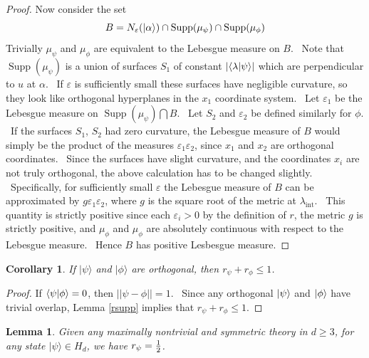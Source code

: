 \documentclass[letterpaper,11pt]{article}
\newtheorem{lem}{Lemma}
\newtheorem{cor}{Corollary}
\newcommand{\braket}[2]{\mbox{$ \langle #1 | #2 \rangle $}}
\newcommand{\ket}[1]{\mbox{$ | #1 \rangle $}}
\DeclareMathOperator{\supp}{Supp}
\begin{document}
\begin{proof}
Now consider the set
\[
B= N_{\varepsilon}(\ket{\alpha}) \cap  \supp(\mu_{\psi}) \cap \supp(\mu_{\phi})
\]
Trivially $\mu_{\psi}$ and $\mu_\phi$ are equivalent to the Lebesgue measure on $B$. \ Note that $\supp(\mu_{\psi})$ is a union of surfaces $S_1$ of constant $| \braket{\lambda }{\psi}|$ which are perpendicular to $u$ at $\alpha$. \ If $\varepsilon$ is sufficiently small these surfaces have negligible curvature, so they look like orthogonal hyperplanes in the $x_1$ coordinate system.  \ Let $\varepsilon_1$ be the Lebesgue measure on $\supp(\mu_{\psi}) \bigcap B$. \ Let $S_2$ and $\varepsilon_2$ be defined similarly for $\phi$. \ If the surfaces $S_1$, $S_2$ had zero curvature, the Lebesgue measure of $B$ would simply be the product of the measures $\varepsilon_1 \varepsilon_2$, since $x_1$ and $x_2$ are orthogonal coordinates. \ Since the surfaces have slight curvature, and the coordinates $x_i$ are not truly orthogonal, the above calculation has to be changed slightly. \ Specifically, for sufficiently small $\varepsilon$ the Lebesgue measure of $B$ can be approximated by $g\varepsilon_1 \varepsilon_2$, where $g$ is the square root of the metric at $\lambda_{\mathrm{int}}$. \ This quantity is strictly positive since each $\varepsilon_i>0$ by the definition of $r$, the metric $g$ is strictly positive, and $\mu_{\phi}$ and $\mu_\phi$ are absolutely continuous with respect to the Lebesgue measure. \ Hence $B$ has positive Lesbesgue measure.

\end{proof}

\begin{cor}
\label{rorth} If $ | \psi \rangle $ and $ | \phi \rangle $
are orthogonal, then $r_{\psi}+r_{\phi}\leq 1$.
\end{cor}

\begin{proof}
If $\braket{\psi}{\phi}=0$, then $||\psi-\phi||=1$. \ Since any orthogonal $\ket{\psi}$ and $\ket{\phi}$ have trivial overlap, Lemma \ref{rsupp} implies that $r_{\psi}+r_{\phi}\leq 1$.
\end{proof}

\begin{lem}
\label{rhalf} Given any maximally nontrivial and symmetric theory in $d\geq 3
$, for any state $ | \psi \rangle \in H_d$, we have $r_{\psi}=\frac{%
1}{2}$.
\end{lem}
\end{document}
